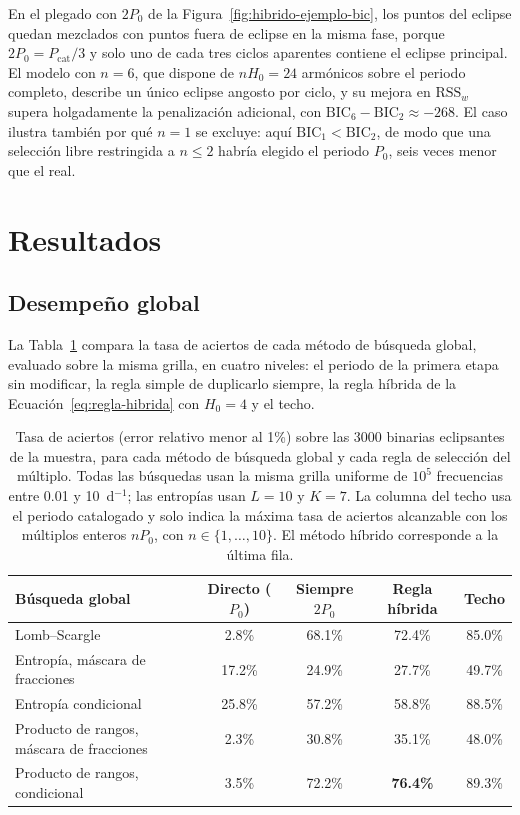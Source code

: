 \documentclass[12pt,letterpaper,oneside]{book}
\begin{document}
En el plegado con $2P_0$ de la Figura~\ref{fig:hibrido-ejemplo-bic}, los puntos del eclipse quedan mezclados con puntos fuera de eclipse en la misma fase, porque $2P_0=P_{\mathrm{cat}}/3$ y solo uno de cada tres ciclos aparentes contiene el eclipse principal. El modelo con $n=6$, que dispone de $nH_0=24$ arm\'onicos sobre el periodo completo, describe un \'unico eclipse angosto por ciclo, y su mejora en $\mathrm{RSS}_w$ supera holgadamente la penalizaci\'on adicional, con $\mathrm{BIC}_6-\mathrm{BIC}_2\approx-268$. El caso ilustra tambi\'en por qu\'e $n=1$ se excluye: aqu\'i $\mathrm{BIC}_1<\mathrm{BIC}_2$, de modo que una selecci\'on libre restringida a $n\leq2$ habr\'ia elegido el periodo $P_0$, seis veces menor que el real.

\section{Resultados}
\label{sec:hibrido-resultados}

\subsection{Desempe\~no global}

La Tabla~\ref{tab:hibrido-resultados} compara la tasa de aciertos de cada m\'etodo de b\'usqueda global, evaluado sobre la misma grilla, en cuatro niveles: el periodo de la primera etapa sin modificar, la regla simple de duplicarlo siempre, la regla h\'ibrida de la Ecuaci\'on~\eqref{eq:regla-hibrida} con $H_0=4$ y el techo.

\begin{table}[H]
	\centering
	\small
	\begin{tabular}{lcccc}
		\hline
		\textbf{B\'usqueda global} & \textbf{Directo ($P_0$)} & \textbf{Siempre $2P_0$} & \textbf{Regla h\'ibrida} & \textbf{Techo} \\
		\hline
		Lomb--Scargle & 2.8\% & 68.1\% & 72.4\% & 85.0\% \\
		Entrop\'ia, m\'ascara de fracciones & 17.2\% & 24.9\% & 27.7\% & 49.7\% \\
		Entrop\'ia condicional & 25.8\% & 57.2\% & 58.8\% & 88.5\% \\
		Producto de rangos, m\'ascara de fracciones & 2.3\% & 30.8\% & 35.1\% & 48.0\% \\
		Producto de rangos, condicional & 3.5\% & 72.2\% & \textbf{76.4\%} & 89.3\% \\
		\hline
	\end{tabular}
	\caption[Aciertos del m\'etodo h\'ibrido y de sus variantes sobre 3000 binarias]{Tasa de aciertos (error relativo menor al 1\%) sobre las 3000 binarias eclipsantes de la muestra, para cada m\'etodo de b\'usqueda global y cada regla de selecci\'on del m\'ultiplo. Todas las b\'usquedas usan la misma grilla uniforme de $10^5$ frecuencias entre 0.01 y 10~d$^{-1}$; las entrop\'ias usan $L=10$ y $K=7$. La columna del techo usa el periodo catalogado y solo indica la m\'axima tasa de aciertos alcanzable con los m\'ultiplos enteros $nP_0$, con $n\in\{1,\dots,10\}$. El m\'etodo h\'ibrido corresponde a la \'ultima fila.}
	\label{tab:hibrido-resultados}
\end{table}
\end{document}
